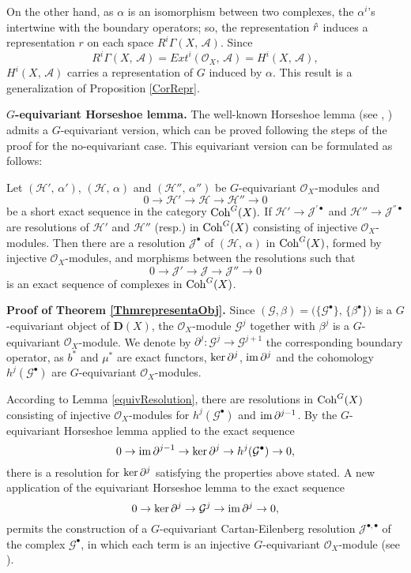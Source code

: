 \documentclass[xypic,amscd,syntonly,amssymb,verbatim,12pt]{amsart}
\theoremstyle{plain}
\theoremstyle{definition}
\theoremstyle{remark}
\numberwithin{equation}{section}
\begin{document}
On the other hand, as $\alpha$ is an isomorphism between two
complexes,
 the $\alpha^i$'s intertwine with the
boundary operators; so, the representation $\Hat r$ induces a
representation $r$ on each space
 $R^i\Gamma(X,\,{\mathcal A})$.
 Since
 $$ R^i\Gamma(X,\,{\mathcal A})={Ext}^i({\mathcal
O}_X,\,{\mathcal A})=H^i(X,\,{\mathcal A}),$$
 $H^i(X,\,{\mathcal A})$ carries a representation of $G$ induced by $\alpha$. This result is a
generalization of Proposition \ref{CorRepr}.

\smallskip
{\bf $G$-equivariant Horseshoe lemma.} The well-known Horseshoe
lemma (see \cite[page 349]{R}, \cite[page 37]{W}) admits a
$G$-equivariant version, which can be proved following the steps
of the proof for the no-equivariant case.   This equivariant
version can be formulated as follows:

 Let $({\mathcal
H'},\,\alpha')$,   $({\mathcal H},\,\alpha)$ and $({\mathcal
H''},\,\alpha'')$  be  $G$-equivariant ${\mathcal O}_X$-modules and
$$0\to{\mathcal H}' \to  {\mathcal
H}\to{\mathcal H}''\to 0$$
 be a short exact sequence in the category ${\rm Coh}^G(X).$
 If ${\mathcal H'}\to{\mathcal J}^{'\bullet}$ and ${\mathcal H''}\to{\mathcal
 J}^{''\bullet}$ are  resolutions of ${\mathcal H}'$ and ${\mathcal H}''$ (resp.) in ${\rm Coh}^G(X)$ consisting of injective
 ${\mathcal O}_X$-modules. Then there are a resolution ${\mathcal J}^{\bullet}$ of $({\mathcal H},\,\alpha)$ in ${\rm Coh}^G(X)$, formed by injective ${\mathcal O}_X$-modules, and morphisms between the resolutions such that
 $$0\to{\mathcal J'}\to {\mathcal J}\to{\mathcal J''} \to 0$$
 is an exact sequence of complexes in ${\rm Coh}^G(X)$.

\smallskip

 \noindent
 {\bf Proof of Theorem \ref{ThmrepresentaObj}.} Since $({\mathcal G},\beta)=\big(\{{\mathcal
G}^{\bullet}\},\,\{\beta^{\bullet}\}\big)$ is a $G$-equivariant
object of ${\mathbf D}(X)$, the ${\mathcal O}_X$-module $
{\mathcal G}^j$ together with $\beta^j$ is a $G$-equivariant
${\mathcal O}_X$-module. We denote by $\partial^j:{\mathcal G}^j\to{\mathcal G}^{j+1}$ the corresponding boundary operator, as $b^*$ and $\mu^*$ are exact functors, ${\rm ker}\,\partial^j$,  ${\rm im}\,\partial^j$ and the cohomology $h^j({\mathcal G}^{\bullet})$
 are $G$-equivariant ${\mathcal O}_X$-modules.

According to Lemma \ref{equivResolution}, there are resolutions in
${\rm Coh}^G(X)$ consisting of injective ${\mathcal O}_X$-modules
for  $h^j({\mathcal G}^{\bullet})$ and ${\rm im}\,\partial^{j-1}$.
By  the $G$-equivariant  Horseshoe lemma applied to the exact
sequence
 $$0\to {\rm im}\,\partial^{j-1}\to {\rm ker}\,\partial^j\to h^j({\mathcal G}^{\bullet})\to 0,$$
 there is a resolution for ${\rm ker}\,\partial^j$
satisfying the properties above stated. A new application of the
equivariant Horseshoe lemma to the exact sequence
$$0\to{\rm ker}\,{\partial}^j\to{\mathcal G}^j\to{\rm im}\,{\partial}^j\to 0,$$
permits
the construction of a $G$-equivariant Cartan-Eilenberg resolution ${\mathcal J}^{\bullet,\bullet}$ of the complex ${\mathcal G}^{\bullet}$, in which each term is an injective $G$-equivariant ${\mathcal O}_X$-module (see \cite[Theorem 10.45]{R}).
 
\end{document}
